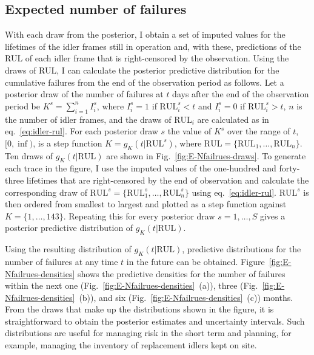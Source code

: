 \subsection{Expected number of failures} \label{subsec:idler-cumulative-failrues}

With each draw from the posterior, I obtain a set of imputed values for the lifetimes of the idler frames still in operation and, with these, predictions of the RUL of each idler frame that is right-censored by the observation. Using the draws of RUL, I can calculate the posterior predictive distribution for the cumulative failures from the end of the observation period as follows. Let a posterior draw of the number of failures at $t$ days after the end of the observation period be $K^s = \sum^{n}_{i = 1}I^s_i$, where $I^s_i = 1$ if $\text{RUL}^s_i < t$ and $I^s_i = 0$ if $\text{RUL}^s_i > t$, $n$ is the number of idler frames, and the draws of $\text{RUL}_i$ are calculated as in eq.~\eqref{eq:idler-rul}. For each posterior draw $s$ the value of $K^s$ over the range of $t$, $[0, \inf)$, is a step function $K = g_K(t|\text{RUL}^s)$, where $\text{RUL} = \{\text{RUL}_1, \dots, \text{RUL}_n\}$. Ten draws of $g_K(t|\text{RUL})$ are shown in Fig.~\ref{fig:E-Nfailrues-draws}. To generate each trace in the figure, I use the imputed values of the one-hundred and forty-three lifetimes that are right-censored by the end of observation and calculate the corresponding draw of $\text{RUL}^s = \{\text{RUL}^s_1, \dots, \text{RUL}^s_n\}$ using eq.~\eqref{eq:idler-rul}. $\text{RUL}^s$ is then ordered from smallest to largest and plotted as a step function against $K = \{1, \dots, 143\}$. Repeating this for every posterior draw $s = 1, \dots, S$ gives a posterior predictive distribution of $g_K(t|\text{RUL})$.

Using the resulting distribution of $g_K(t|\text{RUL})$, predictive distributions for the number of failures at any time $t$ in the future can be obtained. Figure~\ref{fig:E-Nfailrues-densities} shows the predictive densities for the number of failures within the next one (Fig.~\ref{fig:E-Nfailrues-densities}~(a)), three (Fig.~\ref{fig:E-Nfailrues-densities}~(b)), and six (Fig.~\ref{fig:E-Nfailrues-densities}~(c)) months. From the draws that make up the distributions shown in the figure, it is straightforward to obtain the posterior estimates and uncertainty intervals. Such distributions are useful for managing risk in the short term and planning, for example, managing the inventory of replacement idlers kept on site.

